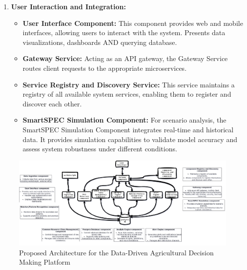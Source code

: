 \documentclass[11pt]{article}
\begin{document}
\begin{enumerate}[label=\arabic*., wide=0pt, left=0pt]
    \item \textbf{User Interaction and Integration:}
    \begin{itemize}
        \item \textbf{User Interface Component:} This component provides web and mobile interfaces, allowing users to interact with the system. Presents data visualizations, dashboards AND querying database.
        \item \textbf{Gateway Service:} Acting as an API gateway, the Gateway Service routes client requests to the appropriate microservices.
        \item \textbf{Service Registry and Discovery Service:} This service maintains a registry of all available system services, enabling them to register and discover each other.
        \item \textbf{SmartSPEC Simulation Component:} For scenario analysis, the SmartSPEC Simulation Component integrates real-time and historical data. It provides simulation capabilities to validate model accuracy and assess system robustness under different conditions.
    \end{itemize}
\end{enumerate}
\begin{figure}[h!]
    \centering
    \includegraphics[width=\textwidth]{archite.png}
    \caption{Proposed Architecture for the Data-Driven Agricultural Decision Making Platform}
    \label{fig:architecture}
\end{figure}
\end{document}
